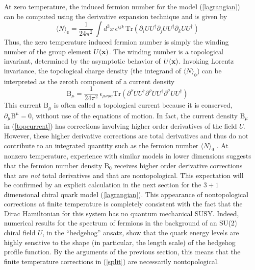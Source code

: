 \documentclass[a4paper,prd,showpacs,showkeys]{revtex4}
\begin{document}
At zero temperature, the induced fermion number for the model (\ref{lagrangian}) can be computed using the derivative expansion technique and is given by \cite{gold,niemi,diakonov,dhoker}
\begin{equation}
\langle N\rangle _0 =\frac{1}{24 \pi ^2}\, \int d^3x\, \epsilon ^{ijk}\, \textrm{Tr} \left(\partial _{i}U U^{\dagger} \partial _{j}U U^{\dagger}  \partial_{k}U U^{\dagger}\right)
\label{topcharge}
\end{equation}
Thus, the zero temperature induced fermion number is simply the winding number of the group element $U({\bf x})$. The winding number is a topological invariant, determined by the asymptotic behavior of $U({\bf x})$.  Invoking Lorentz invariance, the topological charge density (the integrand of $\langle N\rangle _0$) can be interpreted as the zeroth component of a current density
\begin{equation}
\textrm{B} _{\mu} =\frac{1}{24 \pi ^2}\,  \epsilon _{\mu \nu \rho \sigma} \textrm{Tr} \left(\partial^{\nu}U U^{\dagger} \partial^{\rho}U U^{\dagger}  \partial^{\sigma}U U^{\dagger}\right)
\label{topcurrent}
\end{equation} 
This current $\textrm{B}_{\mu}$ is often called a topological current because it is conserved, $\partial_{\mu} \textrm{B}^{\mu}=0$,  without use of the equations of motion. 
In fact, the current density $\textrm{B}_{\mu}$ in (\ref{topcurrent}) has corrections involving higher order derivatives of the field $U$. However, these
higher derivative corrections are total derivatives and
thus do not contribute to an integrated quantity such as the fermion
number $\langle N\rangle _0$ \cite{wilczek,diakonov}. At nonzero temperature, 
experience with similar models in lower dimensions \cite{dunne,nonlinearsigma} suggests that the fermion number density $\textrm{B}_{0}$ receives higher order derivative corrections that are {\it not} total derivatives and that are nontopological. This expectation will be confirmed by an explicit calculation in the next section for the $3+1$ dimensional chiral quark model (\ref{lagrangian}). This appearance of nontopological corrections at finite temperature is completely consistent with the fact that the Dirac Hamiltonian for this system has no quantum mechanical SUSY. Indeed, numerical results \cite{ripka,kahana} for the spectrum of fermions in the background of an SU(2) chiral field $U$, in the ``hedgehog'' ansatz, show that the quark energy levels are highly sensitive to the shape (in particular, the length scale) of the hedgehog profile function. By the arguments of the previous section, this means that the finite temperature corrections in (\ref{split}) are necessarily  nontopological.
 
\end{document}
